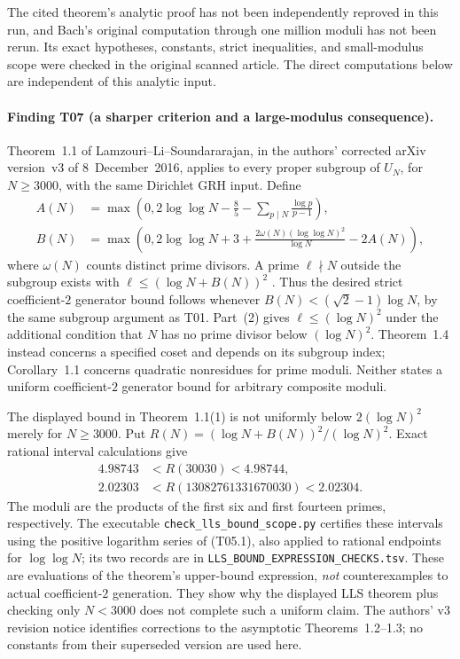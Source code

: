 The cited theorem's analytic proof has not been independently reproved
in this run, and Bach's original computation through one million moduli
has not been rerun. Its exact hypotheses, constants, strict inequalities,
and small-modulus scope were checked in the original scanned article.
The direct computations below are independent of this analytic input.

\paragraph{Finding T07 (a sharper criterion and a large-modulus consequence).}
Theorem~1.1 of Lamzouri--Li--Soundararajan, in the authors' corrected
arXiv version~v3 of 8~December~2016, applies to every proper subgroup
of $U_N$, for $N\geq3000$, with the same Dirichlet GRH input.
Define
\[
 \begin{split}
 A(N)&=\max\left(0,2\log\log N-\frac85
                    -\sum_{p\mid N}\frac{\log p}{p-1}\right),\\
 B(N)&=\max\left(0,2\log\log N+3
          +\frac{2\omega(N)(\log\log N)^2}{\log N}-2A(N)\right),
 \end{split}
\]
where $\omega(N)$ counts distinct prime divisors. A prime $\ell\nmid N$
outside the subgroup exists with
$\ell\leq(\log N+B(N))^2$
\cite[Theorem~1.1(1), corrected arXiv version~v3]{LLS2015}.
Thus the desired strict coefficient-$2$ generator bound follows
whenever $B(N)<(\sqrt2-1)\log N$, by the same subgroup argument as
T01. Part~(2) gives $\ell\leq(\log N)^2$ under the additional
condition that $N$ has no prime divisor below $(\log N)^2$.
Theorem~1.4 instead concerns a specified coset and depends on its
subgroup index; Corollary~1.1 concerns quadratic nonresidues for prime
moduli. Neither states a uniform coefficient-$2$ generator bound for
arbitrary composite moduli.

The displayed bound in Theorem~1.1(1) is not uniformly below
$2(\log N)^2$ merely for $N\geq3000$. Put
$R(N)=(\log N+B(N))^2/(\log N)^2$. Exact rational interval calculations
give
\[
 \begin{split}
 4.98743&<R(30030)<4.98744,\\
 2.02303&<R(13082761331670030)<2.02304.
 \end{split}
\]
The moduli are the products of the first six and first fourteen primes,
respectively. The executable \texttt{check\_lls\_bound\_scope.py}
certifies these intervals using the positive logarithm series of
(T05.1), also applied to rational endpoints for $\log\log N$;
its two records are in \texttt{LLS\_BOUND\_EXPRESSION\_CHECKS.tsv}.
These are evaluations of the theorem's upper-bound expression,
\emph{not} counterexamples to actual coefficient-$2$ generation.
They show why the displayed LLS theorem plus checking only $N<3000$
does not complete such a uniform claim. The authors' v3 revision notice
identifies corrections to the asymptotic Theorems~1.2--1.3; no constants
from their superseded version are used here.

